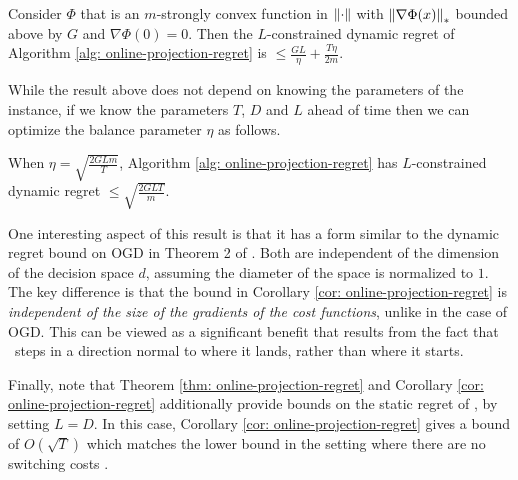 \begin{theorem}
Consider $\Phi$ that is an $m$-strongly convex function in $\left\lVert \cdot \right\rVert$ with $\left\lVert \nabla \Phi(x) \right\rVert_*$ bounded above by $G$ and $\nabla \Phi(0) = 0$. Then the $L$-constrained dynamic regret of Algorithm \ref{alg: online-projection-regret} is $\leq \frac{GL}{\eta}  + \frac{T\eta}{2m}.$
\label{thm: online-projection-regret}
\end{theorem} 

While the result above does not depend on knowing the parameters of the instance, if we know the parameters $T$, $D$ and $L$ ahead of time then we can optimize the balance parameter $\eta$ as follows.

\begin{corollary}\label{cor: online-projection-regret}
When $\eta =\sqrt{\frac{2GLm}{T}}$,  Algorithm \ref{alg: online-projection-regret} has $L$-constrained dynamic regret $\leq \sqrt{\frac{2GLT}{m}}.$ 
\end{corollary}

One interesting aspect of this result is that it has a form similar to the dynamic regret bound on OGD in Theorem 2 of \cite{zinkevich2003}.  Both are independent of the dimension of the decision space $d$, assuming the diameter of the space is normalized to $1$. The key difference is that the bound in Corollary \ref{cor: online-projection-regret} is \emph{independent of the size of the gradients of the cost functions}, unlike in the case of OGD. This can be viewed as a significant benefit that results from the fact that \ourack\ steps in a direction normal to where it lands, rather than where it starts.  

Finally, note that Theorem \ref{thm: online-projection-regret} and Corollary \ref{cor: online-projection-regret} additionally provide bounds on the static regret of \ourack, by setting $L=D$. In this case, Corollary \ref{cor: online-projection-regret} gives a bound of $O(\sqrt{T})$ which matches the lower bound  in the setting where there are no switching costs \citep{hazan2016}.


